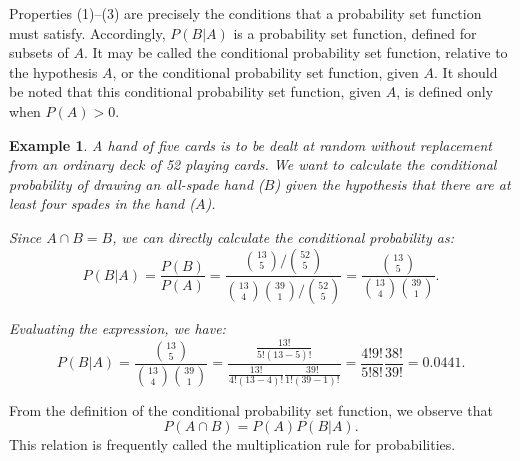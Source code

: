 \documentclass[12pt]{article}
\newtheorem{example}[theorem]{Example}
\newcommand{\1}{{\bf 1}}
\newcommand{\2}{{\bf 2}}
\begin{document}
Properties (1)--(3) are precisely the conditions that a probability set function must satisfy. Accordingly, $P(B|A)$ is a probability set function, defined for subsets of $A$. It may be called the conditional probability set function, relative to the hypothesis $A$, or the conditional probability set function, given $A$. It should be noted that this conditional probability set function, given $A$, is defined only when $P(A) > 0$.
\begin{example}A hand of five cards is to be dealt at random without replacement from an ordinary deck of 52 playing cards. We want to calculate the conditional probability of drawing an all-spade hand ($B$) given the hypothesis that there are at least four spades in the hand ($A$). 

Since $A \cap B = B$, we can directly calculate the conditional probability as:
\[
P(B|A) = \frac{P(B)}{P(A)} = \frac{{\binom{13}{5}/\binom{52}{5}}}{{\binom{13}{4}\binom{39}{1}/\binom{52}{5}}} = \frac{{\binom{13}{5}}}{{\binom{13}{4}\binom{39}{1}}}.
\]

Evaluating the expression, we have:
\[
P(B|A) = \frac{{\binom{13}{5}}}{{\binom{13}{4}\binom{39}{1}}} = \frac{{\frac{13!}{5!(13-5)!}}}{{\frac{13!}{4!(13-4)!}\frac{39!}{1!(39-1)!}}} = \frac{{4!9!}}{{5!8!}}\frac{{38!}}{{39!}} =0.0441.
\]
\end{example}

From the definition of the conditional probability set function, we observe that
\[ P(A \cap B) = P(A)P(B|A). \]
This relation is frequently called the multiplication rule for probabilities.
\end{document}
